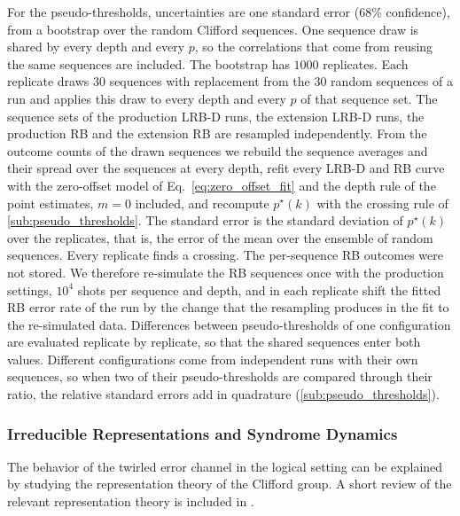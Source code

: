 For the pseudo-thresholds, uncertainties are one standard error (68\% confidence), from a bootstrap over the random Clifford sequences. One sequence draw is shared by every depth and every $p$, so the correlations that come from reusing the same sequences are included. The bootstrap has $1000$ replicates. Each replicate draws 30 sequences with replacement from the 30 random sequences of a run and applies this draw to every depth and every $p$ of that sequence set. The sequence sets of the production LRB-D runs, the extension LRB-D runs, the production RB and the extension RB are resampled independently. From the outcome counts of the drawn sequences we rebuild the sequence averages and their spread over the sequences at every depth, refit every LRB-D and RB curve with the zero-offset model of Eq.~\eqref{eq:zero_offset_fit} and the depth rule of the point estimates, $m = 0$ included, and recompute $p^\star(k)$ with the crossing rule of \autoref{sub:pseudo_thresholds}. The standard error is the standard deviation of $p^\star(k)$ over the replicates, that is, the error of the mean over the ensemble of random sequences. Every replicate finds a crossing. The per-sequence RB outcomes were not stored. We therefore re-simulate the RB sequences once with the production settings, $10^4$ shots per sequence and depth, and in each replicate shift the fitted RB error rate of the run by the change that the resampling produces in the fit to the re-simulated data. Differences between pseudo-thresholds of one configuration are evaluated replicate by replicate, so that the shared sequences enter both values. Different configurations come from independent runs with their own sequences, so when two of their pseudo-thresholds are compared through their ratio, the relative standard errors add in quadrature (\autoref{sub:pseudo_thresholds}).

\subsubsection{Irreducible Representations and Syndrome Dynamics}
\label{sub:irreps}

The behavior of the twirled error channel in the logical setting can be explained by studying the representation theory of the Clifford group.
A short review of the relevant representation theory is included in .

